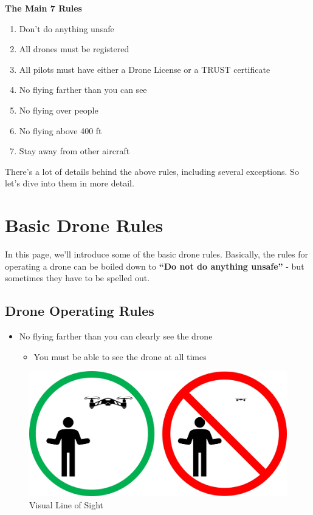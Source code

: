 \documentclass[
  12pt,
]{book}
\providecommand{\tightlist}{%
  \setlength{\itemsep}{0pt}\setlength{\parskip}{0pt}}
\begin{document}
\textbf{The Main 7 Rules}

\begin{enumerate}
\def\labelenumi{\arabic{enumi}.}
\tightlist
\item
  Don't do anything unsafe
\item
  All drones must be registered
\item
  All pilots must have either a Drone License or a TRUST certificate
\item
  No flying farther than you can see
\item
  No flying over people
\item
  No flying above 400 ft
\item
  Stay away from other aircraft
\end{enumerate}

There's a lot of details behind the above rules, including several exceptions. So let's dive into them in more detail.

\hypertarget{basic-drone-rules}{%
\section{Basic Drone Rules}\label{basic-drone-rules}}

In this page, we'll introduce some of the basic drone rules. Basically, the rules for operating a drone can be boiled down to \textbf{``Do not do anything unsafe''} - but sometimes they have to be spelled out.

\hypertarget{drone-operating-rules}{%
\subsection{Drone Operating Rules}\label{drone-operating-rules}}

\begin{itemize}
\tightlist
\item
  No flying farther than you can clearly see the drone

  \begin{itemize}
  \tightlist
  \item
    You must be able to see the drone at all times
  \end{itemize}
\end{itemize}

\begin{figure}

{\centering \includegraphics[width=0.7\linewidth]{images/VLOS_simple} 

}

\caption{Visual Line of Sight}\label{fig:VLOS}
\end{figure}
\end{document}
